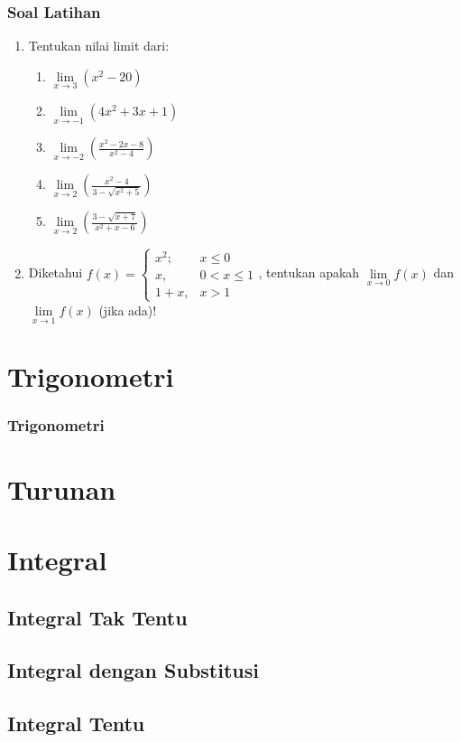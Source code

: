 \documentclass[pdflatex,compress,mathserif]{beamer}
\begin{document}
		\begin{frame}
			\frametitle{Soal Latihan}
			\begin{enumerate}
				\item Tentukan nilai limit dari:
				\begin{enumerate}
					\item $\lim\limits_{x \rightarrow 3} \left( x^2 - 20 \right)$
					\item $\lim\limits_{x \rightarrow -1} \left( 4x^2 + 3x + 1 \right)$
					\item $\lim\limits_{x \rightarrow -2} \left( \frac{x^2 - 2x - 8}{x^2 - 4} \right)$
					\item $\lim\limits_{x \rightarrow 2} \left( \frac{x^2 - 4}{3 - \sqrt{x^2+5}} \right)$
					\item $\lim\limits_{x \rightarrow 2} \left( \frac{3 - \sqrt{x+7}}{x^2 + x - 6} \right)$
				\end{enumerate}
				\item Diketahui $ f(x) = \begin{cases}
					x^2;	& x \leq 0 \\
					x, 		& 0 < x \leq 1 \\
					1 + x,	& x > 1
				\end{cases} $,
				tentukan apakah $ \lim\limits_{x \rightarrow 0} f(x) $ dan $ \lim\limits_{x \rightarrow 1} f(x) $ (jika ada)!
			\end{enumerate}
		\end{frame}
	
\section{Trigonometri}

	\begin{frame}
		\frametitle{Trigonometri}
		
	\end{frame}

\section{Turunan}

\section{Integral}

	\subsection{Integral Tak Tentu}

	\subsection{Integral dengan Substitusi}
	
	\subsection{Integral Tentu}
\end{document}
